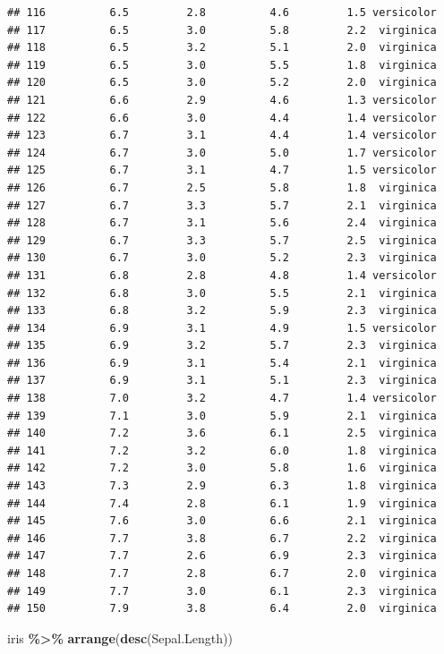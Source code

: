 \documentclass[
]{article}
\newenvironment{Shaded}{\begin{snugshade}}{\end{snugshade}}
\newcommand{\FunctionTok}[1]{\textcolor[rgb]{0.13,0.29,0.53}{\textbf{#1}}}
\newcommand{\NormalTok}[1]{#1}
\newcommand{\SpecialCharTok}[1]{\textcolor[rgb]{0.81,0.36,0.00}{\textbf{#1}}}
\begin{document}
\begin{verbatim}
## 116          6.5         2.8          4.6         1.5 versicolor
## 117          6.5         3.0          5.8         2.2  virginica
## 118          6.5         3.2          5.1         2.0  virginica
## 119          6.5         3.0          5.5         1.8  virginica
## 120          6.5         3.0          5.2         2.0  virginica
## 121          6.6         2.9          4.6         1.3 versicolor
## 122          6.6         3.0          4.4         1.4 versicolor
## 123          6.7         3.1          4.4         1.4 versicolor
## 124          6.7         3.0          5.0         1.7 versicolor
## 125          6.7         3.1          4.7         1.5 versicolor
## 126          6.7         2.5          5.8         1.8  virginica
## 127          6.7         3.3          5.7         2.1  virginica
## 128          6.7         3.1          5.6         2.4  virginica
## 129          6.7         3.3          5.7         2.5  virginica
## 130          6.7         3.0          5.2         2.3  virginica
## 131          6.8         2.8          4.8         1.4 versicolor
## 132          6.8         3.0          5.5         2.1  virginica
## 133          6.8         3.2          5.9         2.3  virginica
## 134          6.9         3.1          4.9         1.5 versicolor
## 135          6.9         3.2          5.7         2.3  virginica
## 136          6.9         3.1          5.4         2.1  virginica
## 137          6.9         3.1          5.1         2.3  virginica
## 138          7.0         3.2          4.7         1.4 versicolor
## 139          7.1         3.0          5.9         2.1  virginica
## 140          7.2         3.6          6.1         2.5  virginica
## 141          7.2         3.2          6.0         1.8  virginica
## 142          7.2         3.0          5.8         1.6  virginica
## 143          7.3         2.9          6.3         1.8  virginica
## 144          7.4         2.8          6.1         1.9  virginica
## 145          7.6         3.0          6.6         2.1  virginica
## 146          7.7         3.8          6.7         2.2  virginica
## 147          7.7         2.6          6.9         2.3  virginica
## 148          7.7         2.8          6.7         2.0  virginica
## 149          7.7         3.0          6.1         2.3  virginica
## 150          7.9         3.8          6.4         2.0  virginica
\end{verbatim}

\begin{Shaded}
\begin{Highlighting}[]
\NormalTok{iris }\SpecialCharTok{\%\textgreater{}\%} 
  \FunctionTok{arrange}\NormalTok{(}\FunctionTok{desc}\NormalTok{(Sepal.Length))}
\end{Highlighting}
\end{Shaded}
\end{document}
